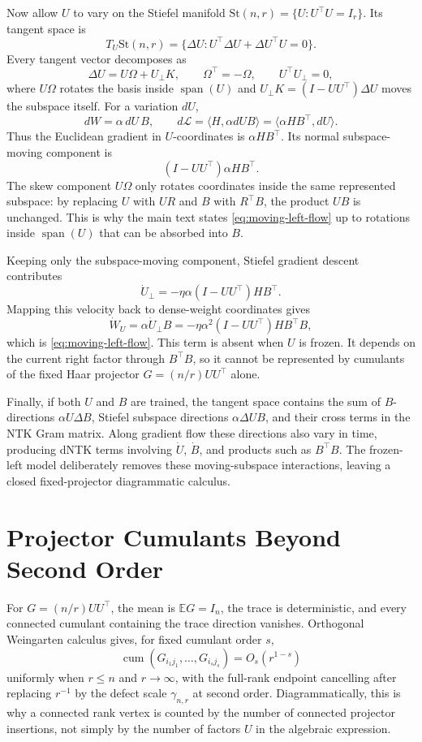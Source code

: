 \documentclass{article}
\newcommand{\E}{\mathbb E}
\newcommand{\cumul}{\operatorname{cum}}
\begin{document}
Now allow \(U\) to vary on the Stiefel manifold \(\mathrm{St}(n,r)=\{U:U^\top U=I_r\}\). Its tangent space is
\[
T_U\mathrm{St}(n,r)
=\{\Delta U:U^\top\Delta U+\Delta U^\top U=0\}.
\]
Every tangent vector decomposes as
\[
\Delta U=U\Omega+U_\perp K,
\qquad
\Omega^\top=-\Omega,
\qquad
U^\top U_\perp=0,
\]
where \(U\Omega\) rotates the basis inside \(\operatorname{span}(U)\) and \(U_\perp K=(I-UU^\top)\Delta U\) moves the subspace itself. For a variation \(dU\),
\[
dW=\alpha\,dU\,B,
\qquad
d\mathcal L
=\langle H,\alpha dU B\rangle
=\langle \alpha H B^\top,dU\rangle.
\]
Thus the Euclidean gradient in \(U\)-coordinates is \(\alpha HB^\top\). Its normal subspace-moving component is
\[
(I-UU^\top)\alpha HB^\top.
\]
The skew component \(U\Omega\) only rotates coordinates inside the same represented subspace: by replacing \(U\) with \(UR\) and \(B\) with \(R^\top B\), the product \(UB\) is unchanged. This is why the main text states \eqref{eq:moving-left-flow} up to rotations inside \(\operatorname{span}(U)\) that can be absorbed into \(B\).

Keeping only the subspace-moving component, Stiefel gradient descent contributes
\[
\dot U_{\perp}
=-\eta\alpha(I-UU^\top)HB^\top.
\]
Mapping this velocity back to dense-weight coordinates gives
\[
\dot W_U
=\alpha \dot U_{\perp}B
=-\eta\alpha^2(I-UU^\top)H B^\top B,
\]
which is \eqref{eq:moving-left-flow}. This term is absent when \(U\) is frozen. It depends on the current right factor through \(B^\top B\), so it cannot be represented by cumulants of the fixed Haar projector \(G=(n/r)UU^\top\) alone.

Finally, if both \(U\) and \(B\) are trained, the tangent space contains the sum of \(B\)-directions \(\alpha U\Delta B\), Stiefel subspace directions \(\alpha\Delta U B\), and their cross terms in the NTK Gram matrix. Along gradient flow these directions also vary in time, producing dNTK terms involving \(\dot U\), \(\dot B\), and products such as \(B^\top B\). The frozen-left model deliberately removes these moving-subspace interactions, leaving a closed fixed-projector diagrammatic calculus.

\section{Projector Cumulants Beyond Second Order}
For \(G=(n/r)UU^\top\), the mean is \(\E G=I_n\), the trace is deterministic, and every connected cumulant containing the trace direction vanishes. Orthogonal Weingarten calculus gives, for fixed cumulant order \(s\),
\begin{equation}
\cumul(G_{i_1j_1},\ldots,G_{i_sj_s})
=O_s(r^{1-s})
\end{equation}
uniformly when \(r\le n\) and \(r\to\infty\), with the full-rank endpoint cancelling after replacing \(r^{-1}\) by the defect scale \(\gamma_{n,r}\) at second order. Diagrammatically, this is why a connected rank vertex is counted by the number of connected projector insertions, not simply by the number of factors \(U\) in the algebraic expression.
\end{document}
